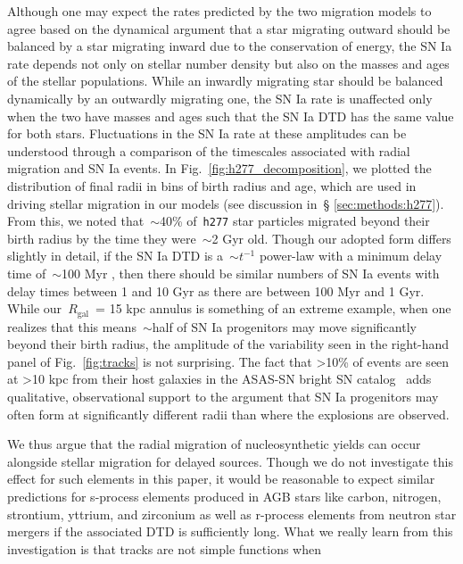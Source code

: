 \documentclass[fleqn, usenatbib]{mnras}
\begin{document}
Although one may expect the rates predicted by the two migration models to 
agree based on the dynamical argument that a star migrating outward should be 
balanced by a star migrating inward due to the conservation of energy, the SN 
Ia rate depends not only on stellar number density but also on the masses and 
ages of the stellar populations. While an inwardly migrating star should be 
balanced dynamically by an outwardly migrating one, the SN Ia rate is 
unaffected only when the two have masses and ages such that the SN Ia DTD has 
the same value for both stars. Fluctuations in the SN Ia rate at these 
amplitudes can be understood through a comparison of the timescales associated 
with radial migration and SN Ia events. In Fig.~\ref{fig:h277_decomposition}, 
we plotted the distribution of final radii in bins of birth radius and age, 
which are used in driving stellar migration in our models (see discussion in~\S 
\ref{sec:methods:h277}). From this, we noted that~$\sim$40\% of~\texttt{h277} 
star particles migrated beyond their birth radius by the time they were~$\sim$2 
Gyr old. Though our adopted form differs slightly in detail, if the SN Ia DTD 
is a~$\sim t^{-1}$ power-law with a minimum delay time of~$\sim$100 Myr 
\citep{Maoz2012, Maoz2017}, then there should be similar numbers of SN Ia 
events with delay times between 1 and 10 Gyr as there are between 100 Myr and 1 
Gyr. While our~$R_\text{gal}$~= 15 kpc annulus is something of an extreme 
example, when one realizes that this means~$\sim$half of SN Ia progenitors may 
move significantly beyond their birth radius, the amplitude of the variability 
seen in the right-hand panel of Fig.~\ref{fig:tracks} is not surprising. The 
fact that >10\% of events are seen at >10 kpc from their host galaxies in the 
ASAS-SN bright SN catalog~\citep{Holoien2019} adds qualitative, observational 
support to the argument that SN Ia progenitors may often form at significantly 
different radii than where the explosions are observed. 
\par 
We thus argue that the radial migration of nucleosynthetic yields can occur 
alongside stellar migration for delayed sources. Though we do not investigate 
this effect for such elements in this paper, it would be reasonable to expect 
similar predictions for s-process elements produced in AGB stars like carbon, 
nitrogen, strontium, yttrium, and zirconium as well as r-process elements from 
neutron star mergers if the associated DTD is sufficiently long. What we really 
learn from this investigation is that tracks are not simple functions when 
\end{document}
